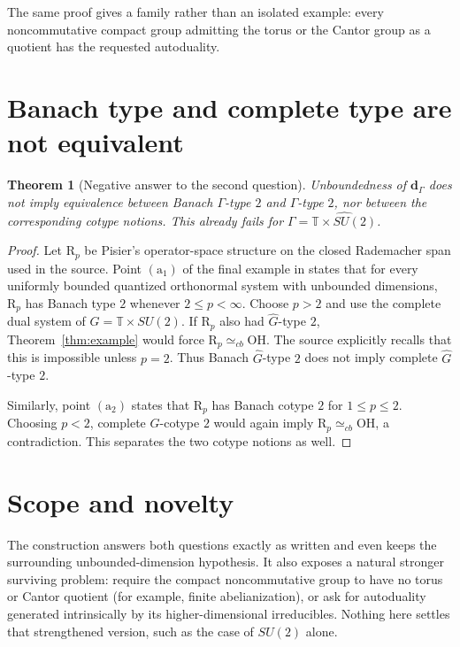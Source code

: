 \documentclass[11pt]{article}
\newtheorem{theorem}{Theorem}
\newcommand{\OH}{\mathrm{OH}}
\newcommand{\Rp}{\mathrm{R}}
\begin{document}
The same proof gives a family rather than an isolated example: every
noncommutative compact group admitting the torus or the Cantor group as a
quotient has the requested autoduality.

\section{Banach type and complete type are not equivalent}

\begin{theorem}[Negative answer to the second question]\label{thm:separation}
Unboundedness of $\mathbf d_\Gamma$ does not imply equivalence between
Banach $\Gamma$-type $2$ and $\Gamma$-type $2$, nor between the corresponding
cotype notions.  This already fails for
$\Gamma=\widehat{\mathbb T\times SU(2)}$.
\end{theorem}

\begin{proof}
Let $\Rp_p$ be Pisier's operator-space structure on the closed Rademacher
span used in the source.  Point $(\mathrm a_1)$ of the final example in
\cite{GP} states that for every uniformly bounded quantized orthonormal
system with unbounded dimensions, $\Rp_p$ has Banach type $2$ whenever
$2\leq p<\infty$.  Choose $p>2$ and use the complete dual system of
$G=\mathbb T\times SU(2)$.  If $\Rp_p$ also had $\widehat G$-type $2$,
Theorem~\ref{thm:example} would force $\Rp_p\simeq_{cb}\OH$.  The source
explicitly recalls that this is impossible unless $p=2$.  Thus Banach
$\widehat G$-type $2$ does not imply complete $\widehat G$-type $2$.

Similarly, point $(\mathrm a_2)$ states that $\Rp_p$ has Banach cotype $2$
for $1\leq p\leq2$.  Choosing $p<2$, complete $\widehat G$-cotype $2$ would
again imply $\Rp_p\simeq_{cb}\OH$, a contradiction.  This separates the two
cotype notions as well.
\end{proof}

\section{Scope and novelty}

The construction answers both questions exactly as written and even keeps
the surrounding unbounded-dimension hypothesis.  It also exposes a natural
stronger surviving problem: require the compact noncommutative group to have
no torus or Cantor quotient (for example, finite abelianization), or ask for
autoduality generated intrinsically by its higher-dimensional irreducibles.
Nothing here settles that strengthened version, such as the case of $SU(2)$
alone.
\end{document}
